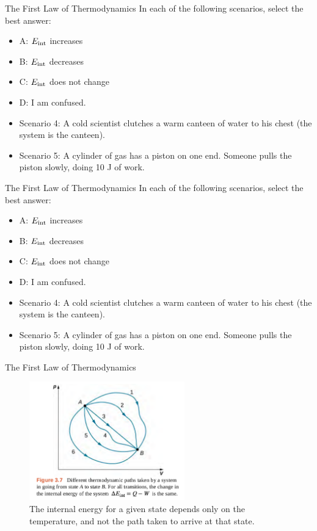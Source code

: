 \documentclass{beamer}
\begin{document}
\begin{frame}{The First Law of Thermodynamics}
In each of the following scenarios, select the best answer:
\small
\begin{itemize}
\item A: $E_{\rm int}$ increases
\item B: $E_{\rm int}$ decreases
\item C: $E_{\rm int}$ does not change
\item D: I am confused.
\end{itemize}
\small
\begin{itemize}
\item Scenario 4: \alert{A cold scientist clutches a warm canteen of water to his chest (the system is the canteen).}
\item Scenario 5: A cylinder of gas has a piston on one end.  Someone pulls the piston slowly, doing 10 J of work.
\end{itemize}
\end{frame}

\begin{frame}{The First Law of Thermodynamics}
In each of the following scenarios, select the best answer:
\small
\begin{itemize}
\item A: $E_{\rm int}$ increases
\item B: $E_{\rm int}$ decreases
\item C: $E_{\rm int}$ does not change
\item D: I am confused.
\end{itemize}
\small
\begin{itemize}
\item Scenario 4: A cold scientist clutches a warm canteen of water to his chest (the system is the canteen).
\item Scenario 5: \alert{A cylinder of gas has a piston on one end.  Someone pulls the piston slowly, doing 10 J of work.}
\end{itemize}
\end{frame}

\begin{frame}{The First Law of Thermodynamics}
\begin{figure}
\centering
\includegraphics[width=0.6\textwidth]{figures/states1.png}
\caption{\label{fig:states} The internal energy for a given state depends only on the temperature, and not the path taken to arrive at that state.}
\end{figure}
\end{frame}
\end{document}
